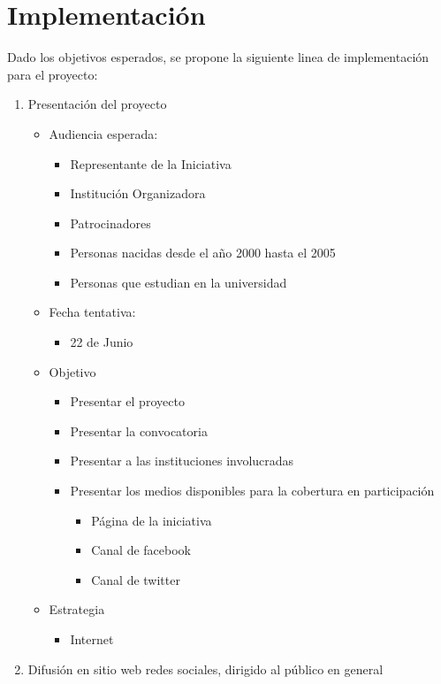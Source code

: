 \documentclass{article}
\begin{document}
\section{Implementación}

Dado los objetivos esperados, se propone la siguiente linea de implementación para el proyecto:

\begin{enumerate}
\item Presentación del proyecto
\begin{itemize}
\item Audiencia esperada:
\begin{itemize}
\item Representante de la Iniciativa
\item Institución Organizadora
\item Patrocinadores
\item Personas nacidas desde el año 2000 hasta el 2005
\item Personas que estudian en la universidad
\end{itemize}
\item Fecha tentativa:
\begin{itemize}
\item 22 de Junio
\end{itemize}
\item Objetivo
\begin{itemize}
\item Presentar el proyecto
\item Presentar la convocatoria
\item Presentar a las instituciones involucradas
\item Presentar los medios disponibles para la cobertura en participación
\begin{itemize}
\item Página de la iniciativa 
\item Canal de facebook
\item Canal de twitter
\end{itemize}
\end{itemize}
\item Estrategia
\begin{itemize}
\item Internet
\end{itemize}
\end{itemize}
\item Difusión en sitio web redes sociales, dirigido al público en general 
\begin{itemize}

\end{itemize}
\end{enumerate}
\end{document}
